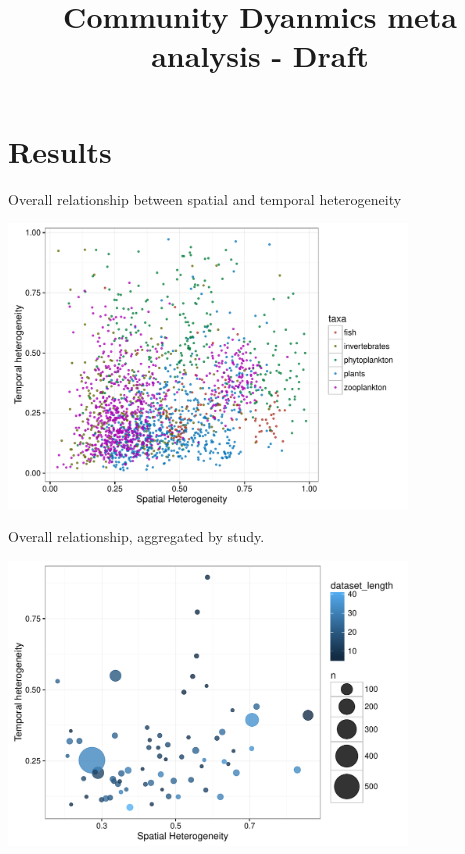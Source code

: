 \documentclass[11pt]{article}
\title{Community Dyanmics meta analysis - Draft}
\begin{document}
\maketitle





\section{Results}


Overall relationship between spatial and temporal heterogeneity

\includegraphics[width=400px]{overall}


\newpage
Overall relationship, aggregated by study.

\includegraphics[width=400px]{overallagg}
\end{document}

